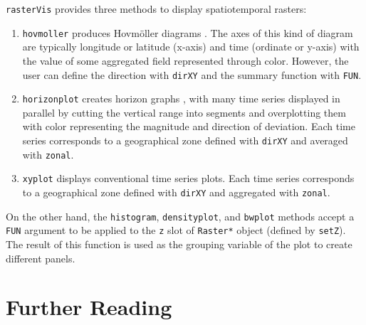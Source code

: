\documentclass[smallroyalvopaper]{memoir}
\begin{document}
\texttt{rasterVis} \cite{Perpinan.Hijmans2013} provides three methods to display spatiotemporal rasters:

\begin{enumerate}
\item \texttt{hovmoller} produces Hovmöller diagrams \cite{Hovmoeller1949a}. The axes of this kind of diagram are typically longitude or latitude (x-axis) and time (ordinate or y-axis) with the value of some aggregated field represented through color. However, the user can define the direction with \texttt{dirXY} and the summary function with \texttt{FUN}.

\item \texttt{horizonplot} creates horizon graphs \cite{Few2008}, with many time series displayed in parallel by cutting the vertical range into segments and overplotting them with color representing the magnitude and direction of deviation. Each time series corresponds to a geographical zone defined with \texttt{dirXY} and averaged with \texttt{zonal}.

\item \texttt{xyplot} displays conventional time series plots. Each time series corresponds to a geographical zone defined with \texttt{dirXY} and aggregated with \texttt{zonal}.
\end{enumerate}

On the other hand, the \texttt{histogram}, \texttt{densityplot}, and \texttt{bwplot} methods accept a \texttt{FUN} argument to be applied to the \texttt{z} slot of \texttt{Raster*} object (defined by \texttt{setZ}). The result of this function is used as the grouping variable of the plot to create different panels.

\section{Further Reading}
\label{sec:orgheadline42}
\label{cha:further-reading-spatiotime}
\end{document}
